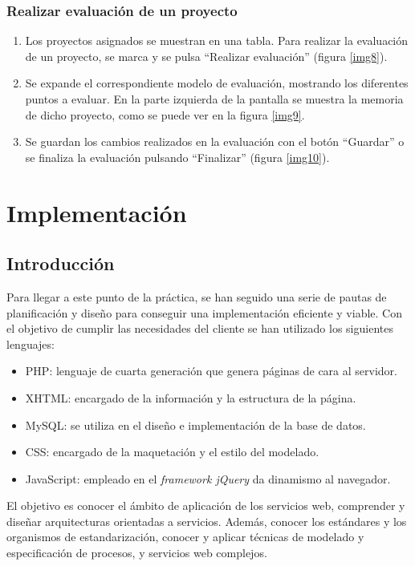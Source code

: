 \documentclass[11pt,a4paper,spanish,twoside]{book}
\begin{document}
\subsection{Realizar evaluación de un proyecto}
\begin{enumerate}
\item Los proyectos asignados se muestran en una tabla. Para realizar la 
  evaluación de un proyecto, se marca y se pulsa ``Realizar evaluación''
  (figura \ref{img8}). 


\item Se expande el correspondiente modelo de evaluación, mostrando los 
  diferentes puntos a evaluar. En la parte izquierda de la pantalla se
  muestra la memoria de dicho proyecto, como se puede ver en la figura
  \ref{img9}. 


\item Se guardan los cambios realizados en la evaluación con el botón 
  ``Guardar'' o se finaliza la evaluación pulsando ``Finalizar'' (figura 
  \ref{img10}).
  
\end{enumerate}

\chapter{Implementación}
\section{Introducción}
Para llegar a este punto de la práctica, se han seguido una serie de pautas de
planificación y diseño para conseguir una implementación eficiente y viable.
Con el objetivo de cumplir las necesidades del cliente se han utilizado los
siguientes lenguajes:
\begin{itemize}
\item PHP\cite{achour}: lenguaje de cuarta generación que genera páginas de cara
al servidor.
\item XHTML\cite{wc}: encargado de la información y la estructura de la página.
\item MySQL: se utiliza en el diseño e implementación de la base de datos.
\item CSS\cite{wc}: encargado de la maquetación y el estilo del modelado.
\item JavaScript\cite{resig}: empleado en el \emph{framework jQuery} da 
dinamismo al navegador.
\end{itemize} 
El objetivo es conocer el ámbito de aplicación de los servicios web, comprender 
y diseñar arquitecturas orientadas a servicios. Además, conocer los estándares y
los organismos de estandarización, conocer y aplicar técnicas de modelado y 
especificación de procesos, y servicios web complejos.
\end{document}
